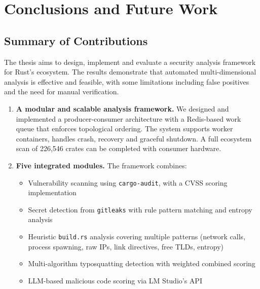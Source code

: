 \chapter{Conclusions and Future Work}\label{chapter:chap9}

\section{Summary of Contributions}\label{sect:contributions}

The thesis aims to design, implement and evaluate a security analysis framework for Rust's ecosystem. The results demonstrate that automated multi-dimensional analysis is effective and feasible, with some limitations including false positives and the need for manual verification.

\begin{enumerate}[leftmargin=*,itemsep=2pt]
\item \textbf{A modular and scalable analysis framework.} We designed and implemented a producer-consumer architecture with a Redis-based work queue that enforces topological ordering. The system supports worker containers, handles crash, recovery and graceful shutdown. A full ecosystem scan of 226,546 crates can be completed with consumer hardware. 

\item \textbf{Five integrated modules.} The framework combines:
\begin{itemize}[leftmargin=*,itemsep=1pt]
\item Vulnerability scanning using \texttt{cargo-audit}, with a CVSS scoring implementation
\item Secret detection from \texttt{gitleaks} with rule pattern matching and entropy analysis
\item Heuristic \texttt{build.rs} analysis covering multiple patterns (network calls, process spawning, raw IPs, link directives, free TLDs, entropy)
\item Multi-algorithm typosquatting detection with weighted combined scoring
\item LLM-based malicious code scoring via LM Studio's API
\end{itemize}



\end{enumerate}
